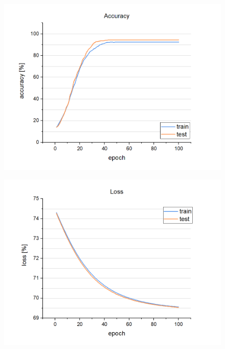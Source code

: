 \begin{figure}[!hbt]
\centering
\begin{minipage}{.5\textwidth}
  \centering
  \includegraphics[width=\linewidth]{resources/accuracy.png}
  \captionsetup{width=\linewidth}
  \label{fig:accuracy}
\end{minipage}%
\begin{minipage}{.5\textwidth}
  \centering
  \includegraphics[width=\linewidth]{resources/loss.png}
  \captionsetup{width=\linewidth}
  \label{fig:loss}
\end{minipage}
\end{figure}

